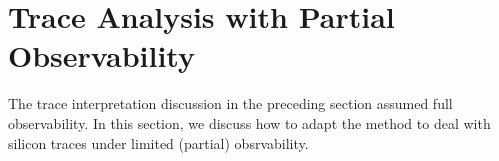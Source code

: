 \documentclass[conference]{IEEEtran}
\begin{document}




\section{Trace Analysis with Partial Observability}

The trace interpretation discussion in the preceding section
assumed full observability.  In this section, we discuss how
to adapt the method to deal with silicon traces under
limited (partial) obsrvability.



\end{document}
